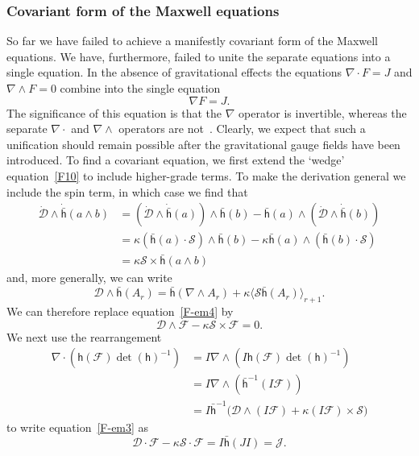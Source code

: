 \documentclass[a4paper]{article}
\numberwithin{equation}{section}
\newcommand{\nn}{\nonumber}
\newcommand{\dt}{\! \cdot \!}
\newcommand{\wdg}{\! \wedge \!}
\newcommand{\crs}{\! \times \!}
\newcommand{\la}{\langle}
\newcommand{\ra}{\rangle}
\newcommand{\cld}{{\mathcal{D}}}
\newcommand{\clf}{{\mathcal{F}}}
\newcommand{\clj}{{\mathcal{J}}}
\newcommand{\cls}{{\mathcal{S}}}
\newcommand{\lih}{\mathsf{h}}
\newcommand{\lbh}{\bar{\mathsf{h}}}
\newcommand{\ho}{\lbh}
\newcommand{\hu}{\lih}
\newcommand{\grad}{\nabla}
\newcommand{\dhi}{\det(\hu)^{-1}}
\newcommand{\cldd}{\dot{\cld}}
\newcommand{\dho}{\dot{\lbh}}
\begin{document}
\subsubsection*{Covariant form of the Maxwell equations}

So far we have failed to achieve a manifestly covariant form of the
Maxwell equations.  We have, furthermore, failed to unite the separate
equations into a single equation.  In the absence of gravitational
effects the equations $\grad\dt F=J$ and $\grad\wdg F=0$ combine into
the single equation
%
\begin{equation}
\grad F = J.
\end{equation}
%
The significance of this equation is that the $\grad$ operator is
invertible, whereas the separate $\grad\cdot$ and $\grad\wedge$
operators are not~\cite{hes-gc,DGL93-paths}.  Clearly, we expect that
such a unification should remain possible after the gravitational
gauge fields have been introduced.  To find a covariant equation, we
first extend the `wedge' equation~\eqref{F10} to include higher-grade
terms.  To make the derivation general we include the spin term, in
which case we find that
%
\begin{align}
\cldd \wdg \dho(a \wdg b) &= (\cldd \wdg \dho(a)) \wdg \ho(b) - \ho(a)
\wdg (\cldd \wdg \dho(b)) \nn \\
&= \kappa (\ho(a) \dt \cls) \wdg \ho(b) - \kappa \ho(a) \wdg (\ho(b) \dt
\cls) \nn \\
&= \kappa \cls \crs \ho(a \wdg b)
\end{align}
%
and, more generally, we can write
%
\begin{equation}
\cld \wdg \ho(A_r) = \ho(\grad \wdg A_r) + \kappa \la \cls \ho(A_r)
\ra_{r+1}.
\end{equation} 
%
We can therefore replace equation~\eqref{F-em4} by
%
\begin{equation}
\cld \wdg \clf - \kappa \cls \crs \clf = 0.
\label{F-em6}
\end{equation}
%
We next use the rearrangement
%
\begin{align}
\grad \dt (\hu(\clf) \dhi) 
&= I\grad \wdg (I \hu(\clf) \dhi) \nn \\
&= I \grad \wdg (\ho^{-1}(I \clf)) \nn \\
&= I \ho^{-1} \bigl( \cld \wdg (I \clf) + \kappa (I \clf) \crs \cls \bigr)
\end{align}
%
to write equation~\eqref{F-em3} as
%
\begin{equation}
\cld \dt \clf - \kappa  \cls \dt \clf = I \ho(J I) = \clj.
\label{F-em7}
\end{equation}
\end{document}

